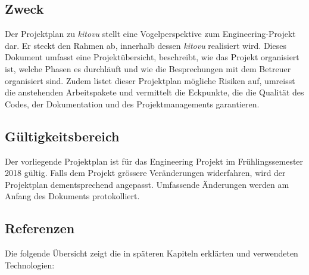 \documentclass[a4paper]{article}
\begin{document}
\subsection{Zweck}
Der Projektplan zu \emph{kitovu} stellt eine Vogelperspektive zum Engineering-Projekt dar. Er steckt den Rahmen ab, innerhalb dessen \emph{kitovu} realisiert wird. Dieses Dokument umfasst eine Projektübersicht, beschreibt, wie das Projekt organisiert ist, welche Phasen es durchläuft und wie die Besprechungen mit dem Betreuer organisiert sind. Zudem listet dieser Projektplan mögliche Risiken auf, umreisst die anstehenden Arbeitspakete und vermittelt die Eckpunkte, die die Qualität des Codes, der Dokumentation und des Projektmanagements garantieren.

\subsection{Gültigkeitsbereich}
Der vorliegende Projektplan ist für das Engineering Projekt im Frühlingssemester 2018 gültig. Falls dem Projekt grössere Veränderungen widerfahren, wird der Projektplan dementsprechend angepasst. Umfassende Änderungen werden am Anfang des Dokuments protokolliert.

\subsection{Referenzen}


Die folgende Übersicht zeigt die in späteren Kapiteln erklärten und verwendeten Technologien:
\end{document}
